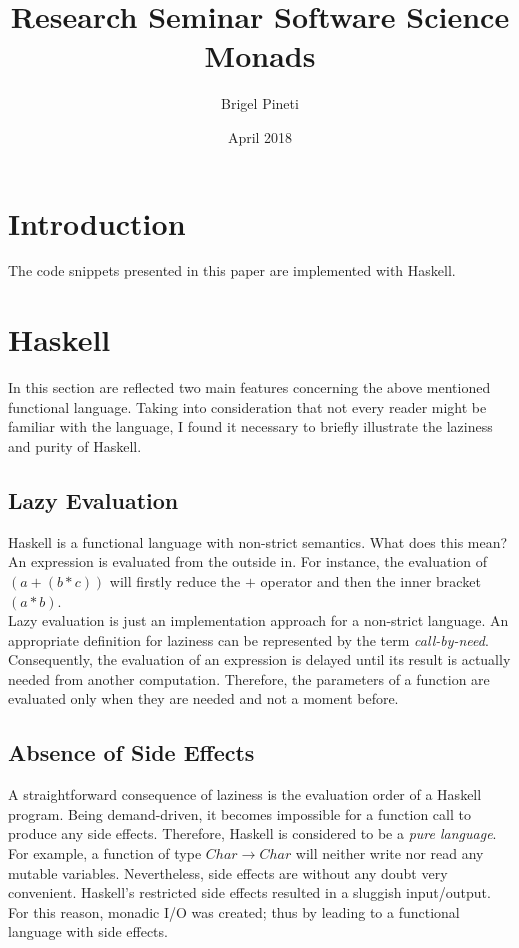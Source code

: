 \documentclass[a4paper, twocolumn]{article}
\title{\Large{Research Seminar Software Science} \\
\huge{Monads}}
\author{Brigel Pineti}
\date{April 2018}
\begin{document}
\maketitle

\section{Introduction}

The code snippets presented in this paper are implemented with Haskell. 

\section{Haskell}

In this section are reflected two main features concerning the above mentioned functional language. Taking into consideration that not every reader might be familiar with the language, I found it necessary to briefly illustrate the laziness and purity of Haskell.  

\subsection{Lazy Evaluation}

Haskell is a functional language with non-strict semantics. What does this mean? An expression is evaluated from the outside in. For instance, the evaluation of \textit{$(a + (b * c))$} will firstly reduce the \textit{$+$} operator and then the inner bracket \textit{$(a * b)$}. \\
Lazy evaluation is just an implementation approach for a non-strict language. An appropriate definition for laziness can be represented by the term \textit{call-by-need}. Consequently, the evaluation of an expression is delayed until its result is actually needed from another computation. Therefore, the parameters of a function are evaluated only when they are needed and not a moment before. 

\subsection{Absence of Side Effects}

A straightforward consequence of laziness is the evaluation order of a Haskell program. Being demand-driven, it becomes impossible for a function call to produce any side effects. Therefore, Haskell is considered to be a \textit{pure language}. For example, a function of type $Char \rightarrow Char$ will neither write nor read any mutable variables. Nevertheless, side effects are without any doubt very convenient. Haskell's restricted side effects resulted in a sluggish input/output. For this reason, monadic I/O was created; thus by leading to a functional language with side effects. 
\end{document}
